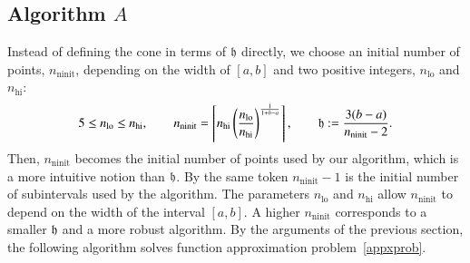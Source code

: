\documentclass[review]{elsarticle}
\theoremstyle{definition}
\DeclareMathOperator{\lo}{lo}
\DeclareMathOperator{\ninit}{ninit}
\begin{document}
\subsection{Algorithm $A$} \label{subsec:appxalgo}

Instead of defining the cone in terms of $\mathfrak{h}$ directly, we choose an initial
number of points, $n_{\ninit}$, depending on the width of $[a,b]$ and two
positive integers, $n_{\lo}$ and $n_{\text{hi}}$:
\begin{equation}
\label{nodefinition}
5 \le n_{\lo} \le n_{\text{hi}}, \qquad n_{\ninit} = \left\lceil n_{\text{hi}}
\left(\frac{n_{\lo}}{n_{\text{hi}}}\right)^{\frac{1}{1+b-a}}\right\rceil,  \qquad \fh := \frac{3(b-a)}{n_{\ninit}-2}.
\end{equation}
Then, $n_{\ninit}$ becomes the initial number of points used by our algorithm,
which is a more intuitive notion than $\mathfrak{h}$. By the same token $n_{\ninit} -1$
is the initial number of subintervals used by the algorithm. The parameters
$n_{\lo}$ and $n_{\text{hi}}$ allow $n_{\ninit}$ to depend on the width of the
interval $[a,b]$. A higher $n_{\ninit}$ corresponds to a smaller $\mathfrak{h}$ and a
more robust algorithm. By the arguments of the previous section, the following
algorithm solves function approximation problem~\eqref{appxprob}.
\end{document}

